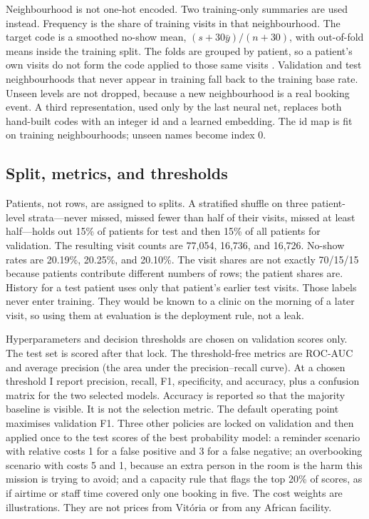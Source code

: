 \documentclass[journal]{IEEEtran}
\begin{document}
Neighbourhood is not one-hot encoded. Two training-only summaries are used instead. Frequency is the share of training visits in that neighbourhood. The target code is a smoothed no-show mean, $(s + 30\bar{y})/(n+30)$, with out-of-fold means inside the training split. The folds are grouped by patient, so a patient's own visits do not form the code applied to those same visits \cite{kaufman2012}. Validation and test neighbourhoods that never appear in training fall back to the training base rate. Unseen levels are not dropped, because a new neighbourhood is a real booking event. A third representation, used only by the last neural net, replaces both hand-built codes with an integer id and a learned embedding. The id map is fit on training neighbourhoods; unseen names become index 0.

\subsection{Split, metrics, and thresholds}
Patients, not rows, are assigned to splits. A stratified shuffle on three patient-level strata---never missed, missed fewer than half of their visits, missed at least half---holds out 15\% of patients for test and then 15\% of all patients for validation. The resulting visit counts are 77{,}054, 16{,}736, and 16{,}726. No-show rates are 20.19\%, 20.25\%, and 20.10\%. The visit shares are not exactly 70/15/15 because patients contribute different numbers of rows; the patient shares are. History for a test patient uses only that patient's earlier test visits. Those labels never enter training. They would be known to a clinic on the morning of a later visit, so using them at evaluation is the deployment rule, not a leak.

Hyperparameters and decision thresholds are chosen on validation scores only. The test set is scored after that lock. The threshold-free metrics are ROC-AUC and average precision (the area under the precision--recall curve). At a chosen threshold I report precision, recall, F1, specificity, and accuracy, plus a confusion matrix for the two selected models. Accuracy is reported so that the majority baseline is visible. It is not the selection metric. The default operating point maximises validation F1. Three other policies are locked on validation and then applied once to the test scores of the best probability model: a reminder scenario with relative costs 1 for a false positive and 3 for a false negative; an overbooking scenario with costs 5 and 1, because an extra person in the room is the harm this mission is trying to avoid; and a capacity rule that flags the top 20\% of scores, as if airtime or staff time covered only one booking in five. The cost weights are illustrations. They are not prices from Vit\'oria or from any African facility.
\end{document}
